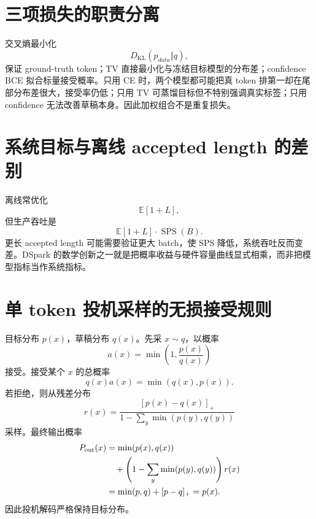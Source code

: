 \documentclass[UTF8,12pt,a4paper,fontset=none]{ctexart}
\numberwithin{equation}{section}
\newcommand{\E}{\mathbb{E}}
\newcommand{\KL}{D_{\mathrm{KL}}}
\begin{document}
\section{三项损失的职责分离}
交叉熵最小化
\begin{equation}
 \KL(p_{data}\Vert q),
\end{equation}
保证 ground-truth token；TV 直接最小化与冻结目标模型的分布差；confidence BCE 拟合标量接受概率。只用 CE 时，两个模型都可能把真 token 排第一却在尾部分布差很大，接受率仍低；只用 TV 可蒸馏目标但不特别强调真实标签；只用 confidence 无法改善草稿本身。因此加权组合不是重复损失。

\section{系统目标与离线 accepted length 的差别}
离线常优化
\begin{equation}
 \E[1+L],
\end{equation}
但生产吞吐是
\begin{equation}
 \E[1+L]\cdot\operatorname{SPS}(B).
\end{equation}
更长 accepted length 可能需要验证更大 batch，使 SPS 降低，系统吞吐反而变差。DSpark 的数学创新之一就是把概率收益与硬件容量曲线显式相乘，而非把模型指标当作系统指标。
\clearpage
\section{单 token 投机采样的无损接受规则}
目标分布 $p(x)$，草稿分布 $q(x)$。先采 $x\sim q$，以概率
\begin{equation}
 a(x)=\min\left(1,\frac{p(x)}{q(x)}\right)
\end{equation}
接受。接受某个 $x$ 的总概率
\begin{equation}
 q(x)a(x)=\min(q(x),p(x)).
\end{equation}
若拒绝，则从残差分布
\begin{equation}
 r(x)=\frac{[p(x)-q(x)]_+}
 {1-\sum_y\min(p(y),q(y))}
\end{equation}
采样。最终输出概率
\begin{align}
 P_{\rm out}(x)
 &=\min(p(x),q(x))\\
 &\quad+
 \left(1-\sum_y\min(p(y),q(y))\right)r(x)\\
 &=\min(p,q)+[p-q]_+=p(x).
\end{align}
因此投机解码严格保持目标分布。
\end{document}
